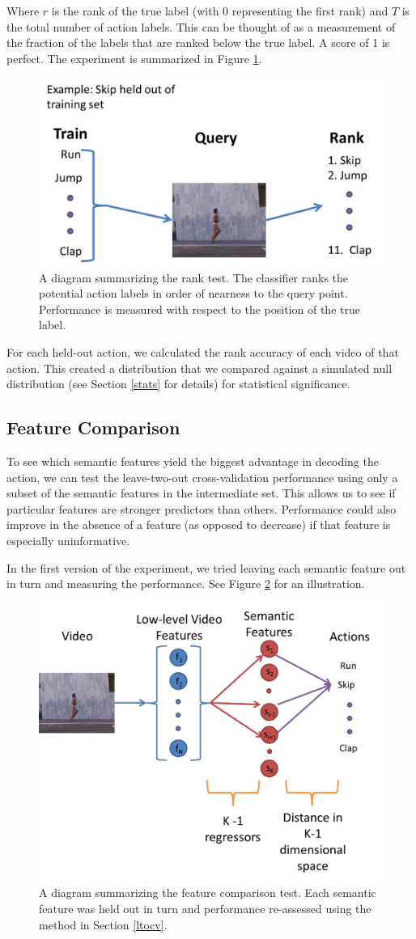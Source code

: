 \documentclass{article}
\begin{document}
Where $r$ is the rank of the true label (with $0$ representing the first rank) and $T$ is the total number of action labels.  This can be thought of as a measurement of the fraction of the labels that are ranked below the true label. A score of 1 is perfect. The experiment is summarized in Figure \ref{ranking}.

\begin{figure}[h]
  \centering
  \includegraphics[width = .4\linewidth]{ranking}
  \caption{A diagram summarizing the rank test. The classifier ranks the potential action labels in order of nearness to the query point. Performance is measured with respect to the position of the true label.}
  \label{ranking}
\end{figure}
\label{rank}

For each held-out action, we calculated the rank accuracy of each video of that action. This created a distribution that we compared against a simulated null distribution (see Section \ref{stats} for details) for statistical significance.

\subsection{Feature Comparison}
To see which semantic features yield the biggest advantage in decoding the action, we can test the leave-two-out cross-validation performance using only a subset of the semantic features in the intermediate set. This allows us to see if particular features are stronger predictors than others.  Performance could also improve in the absence of a feature (as opposed to decrease) if that feature is especially uninformative.

In the first version of the experiment, we tried leaving each semantic feature out in turn and measuring the performance. See Figure \ref{feature} for an illustration.

\begin{figure}[h]
  \centering
  \includegraphics[width = .45\linewidth]{features}
  \caption{A diagram summarizing the feature comparison test. Each semantic feature was held out in turn and performance re-assessed using the method in Section \ref{ltocv}.}
  \label{feature}
\end{figure}
\end{document}

